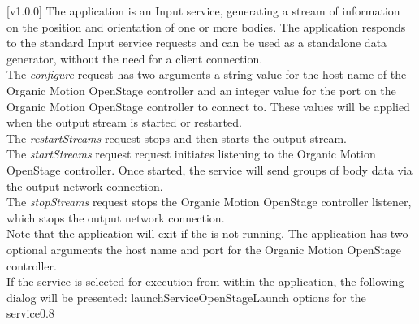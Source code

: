 [v1.0.0]
The  application is an Input service,
generating a stream of information on the position and orientation of one or more bodies.
The application responds to the standard Input service requests and can be used as a
standalone data generator, without the need for a client connection.\\

The \emph{configure} request has two arguments \longDash{} a string value for the host
name of the Organic Motion OpenStage controller and an integer value for the port on the
Organic Motion OpenStage controller to connect to.
These values will be applied when the output stream is started or restarted.\\ 

The \emph{restartStreams} request stops and then starts the output stream.\\

The \emph{startStreams} request request initiates listening to the Organic Motion
OpenStage controller.
Once started, the service will send groups of body data via the output \yarp{} network
connection.\\

The \emph{stopStreams} request stops the Organic Motion OpenStage controller listener,
which stops the output \yarp{} network connection.\\ 

Note that the application will exit if the \emph{\RS} is not running.
The application has two optional arguments \longDash{} the host name and port for the
Organic Motion OpenStage controller.
\insertAppParameters
\insertTagDescription{\OSI}
\insertInputServiceComment\\

\insertStandardServiceCommands
\secondaryEnd
\condPage
{}
If the service is selected for execution from within the \emph{\MMMU}
application, the following dialog will be presented:
%
{launchServiceOpenStage}{Launch options for the \emph{\OSI} service}{0.8}

